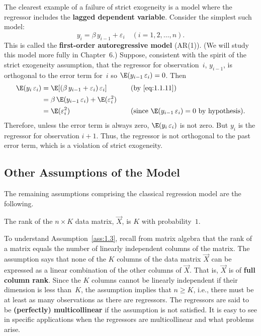 The clearest example of a failure of strict exogeneity is a model where the
regressor includes the \textbf{lagged dependent variable}.  Consider the
simplest such model:
\begin{equation}
  y_i = \beta\, y_{i-1} + \varepsilon_i \quad (i = 1, 2, \ldots, n).
  \label{eq:1.1.11}
\end{equation}
This is called the \textbf{first-order autoregressive model} (AR(1)).  (We will
study this model more fully in Chapter~6.)  Suppose, consistent with the spirit
of the strict exogeneity assumption, that the regressor for observation~$i$,
$y_{i-1}$, is orthogonal to the error term for~$i$ so
$\E(y_{i-1}\,\varepsilon_i) = 0$.  Then
\begin{align*}
  \E(y_i\,\varepsilon_i)
    &= \E[(\beta\, y_{i-1} + \varepsilon_i)\,\varepsilon_i]
       &\quad&\text{(by \eqref{eq:1.1.11})} \\
    &= \beta\,\E(y_{i-1}\,\varepsilon_i) + \E(\varepsilon_i^2) \\
    &= \E(\varepsilon_i^2)
       &&\text{(since $\E(y_{i-1}\,\varepsilon_i) = 0$ by hypothesis)}.
\end{align*}
Therefore, unless the error term is always zero, $\E(y_i\,\varepsilon_i)$ is
not zero.  But $y_i$ is the regressor for observation $i+1$.  Thus, the
regressor is not orthogonal to the past error term, which is a violation of
strict exogeneity.

\subsection*{Other Assumptions of the Model}

The remaining assumptions comprising the classical regression model are the
following.

\begin{assumption}[no multicollinearity]
\label{ass:1.3}
The rank of the $n \times K$ data matrix, $\vec{X}$, is $K$ with probability~$1$.
\end{assumption}

To understand Assumption~\ref{ass:1.3}, recall from matrix algebra that the
rank of a matrix equals the number of linearly independent columns of the
matrix.  The assumption says that none of the $K$ columns of the data matrix
$\vec{X}$ can be expressed as a linear combination of the other columns of
$\vec{X}$.  That is, $\vec{X}$ is of \textbf{full column rank}.  Since the $K$
columns cannot be linearly independent if their dimension is less than~$K$, the
assumption implies that $n \geq K$, i.e., there must be at least as many
observations as there are regressors.  The regressors are said to be
\textbf{(perfectly) multicollinear} if the assumption is not satisfied.  It is
easy to see in specific applications when the regressors are multicollinear and
what problems arise.

